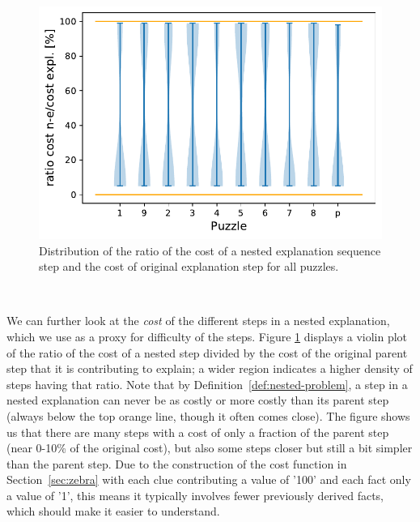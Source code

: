 
\begin{figure}[h]
	\centering
	\includegraphics[width=.6\textwidth]{figures/violin_plot.pdf}
	\caption{Distribution of the ratio of the cost of a nested explanation sequence step and the cost of original explanation step for all puzzles. } 
	\label{fig:experiments:violin}
\end{figure}

$ $

We can further look at the \textit{cost} of the different steps in a nested explanation, which we use as a proxy for difficulty of the steps. 
Figure \ref{fig:experiments:violin} displays a violin plot of the ratio of the cost of a nested step divided by the cost of the original parent step that it is contributing to explain; a wider region indicates a higher density of steps having that ratio. 
Note that by Definition~\ref{def:nested-problem}, a step in a nested explanation can never be as costly or more costly than its parent step (always below the top orange line, though it often comes close).
The figure shows us that there are many steps with a cost of only a fraction of the parent step (near 0-10\% of the original cost), but also some steps closer but still a bit simpler than the parent step. 
Due to the construction of the cost function in Section~\ref{sec:zebra} with each clue contributing a value of '100' and each fact only a value of '1', this means it typically involves fewer previously derived facts, which should make it easier to understand. 



